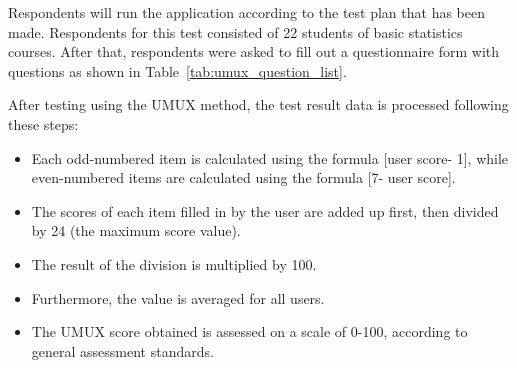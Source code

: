 \documentclass[conference,a4paper]{IEEEtran}
\begin{document}
\begin{enumerate}[label=\alph*.]
        Respondents will run the application according to the test plan that has been made. Respondents for this test consisted of 22 students of basic statistics courses. After that, respondents were asked to fill out a questionnaire form with questions as shown in Table~\ref{tab:umux_question_list}.

        \begin{table}[htbp]
          \caption{UMUX QUESTION LIST \cite{b12}}
          \label{tab:umux_question_list}
        \end{table}
\end{enumerate}



After testing using the UMUX method, the test result data is processed following these steps:
\begin{itemize}
  \item Each odd-numbered item is calculated using the formula [user score- 1], while even-numbered items are calculated using the formula [7- user score].
  \item The scores of each item filled in by the user are added up first, then divided by 24 (the maximum score value).
  \item The result of the division is multiplied by 100.
  \item Furthermore, the value is averaged for all users.
  \item The UMUX score obtained is assessed on a scale of 0-100, according to general assessment standards\cite{b13}.
\end{itemize}
\end{document}
